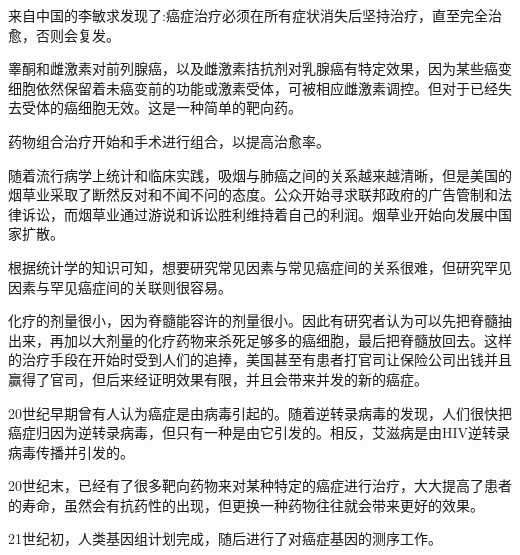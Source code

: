 \begin{itemize*}
	\item 来自中国的李敏求发现了:癌症治疗必须在所有症状消失后坚持治疗，直至完全治愈，否则会复发。
	\item 睾酮和雌激素对前列腺癌，以及雌激素拮抗剂对乳腺癌有特定效果，因为某些癌变细胞依然保留着未癌变前的功能或激素受体，可被相应雌激素调控。但对于已经失去受体的癌细胞无效。这是一种简单的靶向药。
	\item 药物组合治疗开始和手术进行组合，以提高治愈率。
	\item 随着流行病学上统计和临床实践，吸烟与肺癌之间的关系越来越清晰，但是美国的烟草业采取了断然反对和不闻不问的态度。公众开始寻求联邦政府的广告管制和法律诉讼，而烟草业通过游说和诉讼胜利维持着自己的利润。烟草业开始向发展中国家扩散。
	\item 根据统计学的知识可知，想要研究常见因素与常见癌症间的关系很难，但研究罕见因素与罕见癌症间的关联则很容易。
	\item 化疗的剂量很小，因为脊髓能容许的剂量很小。因此有研究者认为可以先把脊髓抽出来，再加以大剂量的化疗药物来杀死足够多的癌细胞，最后把脊髓放回去。这样的治疗手段在开始时受到人们的追捧，美国甚至有患者打官司让保险公司出钱并且赢得了官司，但后来经证明效果有限，并且会带来并发的新的癌症。
	\item 20世纪早期曾有人认为癌症是由病毒引起的。随着逆转录病毒的发现，人们很快把癌症归因为逆转录病毒，但只有一种是由它引发的。相反，艾滋病是由HIV逆转录病毒传播并引发的。
	\item 20世纪末，已经有了很多靶向药物来对某种特定的癌症进行治疗，大大提高了患者的寿命，虽然会有抗药性的出现，但更换一种药物往往就会带来更好的效果。
	\item 21世纪初，人类基因组计划完成，随后进行了对癌症基因的测序工作。
\end{itemize*}

